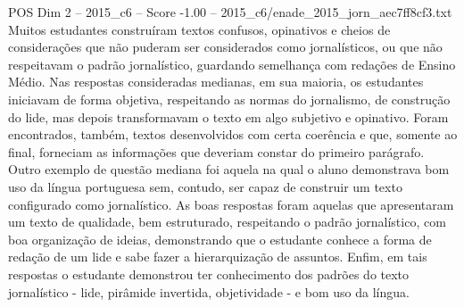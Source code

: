 \begin{textsample}{POS Dim 2 – 2015\_c6 – Score -1.00 – 2015\_c6/enade\_2015\_jorn\_aec7ff8cf3.txt}
Muitos estudantes construíram textos confusos, opinativos e cheios de considerações que não puderam ser considerados como jornalísticos, ou que não respeitavam o padrão jornalístico, guardando semelhança com redações de Ensino Médio.
Nas respostas consideradas medianas, em sua maioria, os estudantes iniciavam de forma objetiva, respeitando as normas do jornalismo, de construção do lide, mas depois transformavam o texto em algo subjetivo e opinativo.
Foram encontrados, também, textos desenvolvidos com certa coerência e que, somente ao final, forneciam as informações que deveriam constar do primeiro parágrafo.
Outro exemplo de questão mediana foi aquela na qual o aluno demonstrava bom uso da língua portuguesa sem, contudo, ser capaz de construir um texto configurado como jornalístico.
As boas respostas foram aquelas que apresentaram um texto de qualidade, bem estruturado, respeitando o padrão jornalístico, com boa organização de ideias, demonstrando que o estudante conhece a forma de redação de um lide e sabe fazer a hierarquização de assuntos.
Enfim, em tais respostas o estudante demonstrou ter conhecimento dos padrões do texto jornalístico - lide, pirâmide invertida, objetividade - e bom uso da língua.

\end{textsample}
